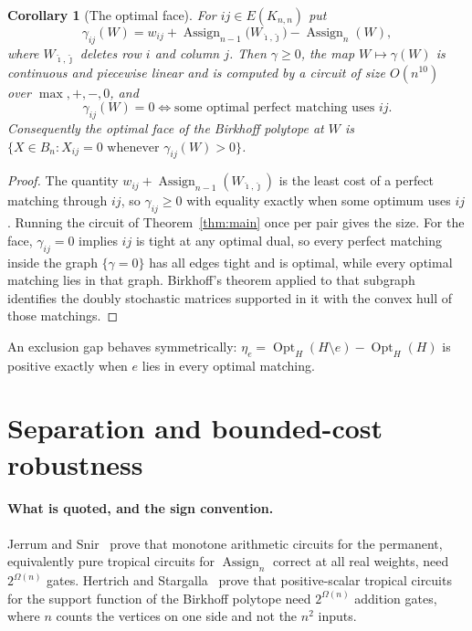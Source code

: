 \documentclass[11pt]{article}
\newtheorem{corollary}[theorem]{Corollary}
\newcommand{\Assign}{\operatorname{Assign}}
\newcommand{\Opt}{\operatorname{Opt}}
\begin{document}
\begin{corollary}[The optimal face]
\label{cor:optimal-face}
For $ij\in E(K_{n,n})$ put
\begin{equation}
  \gamma_{ij}(W)=w_{ij}+\Assign_{n-1}\bigl(W_{\hat\imath,\hat\jmath}\bigr)-\Assign_n(W),
  \label{eq:forced-gap}
\end{equation}
where $W_{\hat\imath,\hat\jmath}$ deletes row $i$ and column $j$.  Then
$\gamma\ge0$, the map $W\mapsto\gamma(W)$ is continuous and piecewise linear and
is computed by a circuit of size $O(n^{10})$ over $\max,+,-,0$, and
\[
  \gamma_{ij}(W)=0
  \iff
  \text{some optimal perfect matching uses } ij .
\]
Consequently the optimal face of the Birkhoff polytope at $W$ is
$\{X\in B_n: X_{ij}=0 \text{ whenever } \gamma_{ij}(W)>0\}$.
\end{corollary}

\begin{proof}
The quantity $w_{ij}+\Assign_{n-1}(W_{\hat\imath,\hat\jmath})$ is the least cost
of a perfect matching through $ij$, so $\gamma_{ij}\ge0$ with equality exactly
when some optimum uses $ij$.  Running the circuit of Theorem~\ref{thm:main} once
per pair gives the size.  For the face, $\gamma_{ij}=0$ implies $ij$ is tight at
any optimal dual, so every perfect matching inside the graph
$\{\gamma=0\}$ has all edges tight and is optimal, while every optimal matching
lies in that graph.  Birkhoff's theorem applied to that subgraph identifies the
doubly stochastic matrices supported in it with the convex hull of those
matchings.
\end{proof}

An exclusion gap behaves symmetrically: $\eta_e=\Opt_H(H\setminus e)-\Opt_H(H)$
is positive exactly when $e$ lies in every optimal matching.

\section{Separation and bounded-cost robustness}
\label{sec:separation}

\paragraph{What is quoted, and the sign convention.}
Jerrum and Snir~\cite{jerrum-snir82} prove that monotone arithmetic circuits for
the permanent, equivalently pure tropical circuits for $\Assign_n$ correct at all
real weights, need $2^{\Omega(n)}$ gates.  Hertrich and
Stargalla~\cite{hertrich-stargalla26} prove that positive-scalar tropical
circuits for the support function of the Birkhoff polytope need $2^{\Omega(n)}$
addition gates, where $n$ counts the vertices on one side and not the $n^{2}$
inputs.
\end{document}

